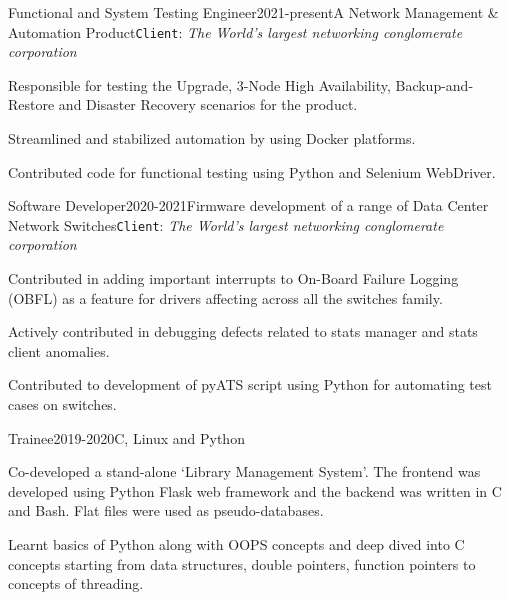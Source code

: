 \documentclass{gradstudentresume}
\begin{document}
\medspace

\begin{work_experience}{Functional and System Testing Engineer}{2021-present}{A Network Management \& Automation Product}{\texttt{Client}: \textit{The World's largest networking conglomerate corporation}}
	
\item{Responsible for testing the Upgrade, 3-Node High Availability, Backup-and-Restore and Disaster Recovery scenarios for the product.}
\item{Streamlined and stabilized automation by using Docker platforms.}
\item{Contributed code for functional testing using Python and Selenium WebDriver.}
\end{work_experience}
\medspace

\begin{work_experience}{Software Developer}{2020-2021}{Firmware development of a range of Data Center Network Switches}{\texttt{Client}: \textit{The World's largest networking conglomerate corporation}}
	\item Contributed in adding important interrupts to On-Board Failure Logging (OBFL) as a feature for drivers affecting across all the switches family. 
	\item Actively contributed in debugging defects related to stats manager and stats client anomalies.
    \item Contributed to development of pyATS script using Python for automating test cases on switches.
\end{work_experience}

\begin{work_experience_2}{Trainee}{2019-2020}{C, Linux and Python}
\item{Co-developed a stand-alone \enquote*{Library Management System}. The frontend was developed using Python Flask web framework and the backend was written in C and Bash. Flat files were used as pseudo-databases.}

\item{Learnt basics of Python along with OOPS concepts and deep dived into C concepts starting from data structures, double pointers, function pointers to concepts of threading.}

\end{work_experience_2}
\largespace
\end{document}

